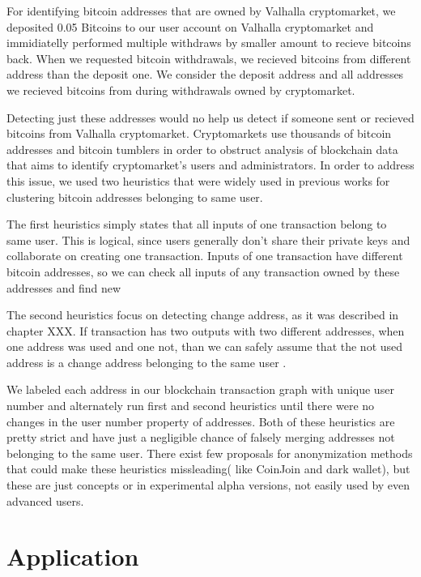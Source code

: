 \documentclass[
  digital, %
  table,   %
  lof,     %
  lot,     %
  oneside
]{fithesis3}
\begin{document}
For identifying bitcoin addresses that are owned by Valhalla cryptomarket, we 
deposited 0.05 Bitcoins to our user account on Valhalla cryptomarket and immidiatelly
performed multiple withdraws by smaller amount to recieve bitcoins back.
When we requested bitcoin withdrawals, we recieved bitcoins from different address
than the deposit one. We consider the deposit address and all addresses we recieved
bitcoins from during withdrawals owned by cryptomarket.

Detecting just these addresses would no help us detect
if someone sent or recieved bitcoins from Valhalla cryptomarket.
Cryptomarkets use thousands of bitcoin addresses and
bitcoin tumblers in order to obstruct analysis of blockchain data
that aims to identify cryptomarket's users and administrators.
In order to address this issue, we used two heuristics that were widely used
in previous works \parencite{androulaki2013evaluating}\parencite{reid2013analysis}
for clustering bitcoin addresses belonging to same user.

The first heuristics simply states that all inputs of one transaction belong to same user. This is logical,
since users generally don't share their private keys and collaborate on creating one transaction.
Inputs of one transaction have different bitcoin addresses, so we can check all inputs of any transaction
owned by these addresses and find new 

The second heuristics focus on detecting change address, as it was described in chapter XXX.
If transaction has two outputs with two different addresses, when one address was used and one not,
than we can safely assume that the not used address is a change address belonging to the same user \parencite{androulaki2013evaluating}.

We labeled each address in our blockchain transaction graph with unique user number
and alternately run first and second heuristics until there were no changes in the user number property of addresses.
Both of these heuristics are pretty strict and have just a negligible chance of falsely merging
addresses not belonging to the same user\parencite{androulaki2013evaluating}.
There exist few proposals for anonymization methods that could make
these heuristics missleading( like CoinJoin and dark wallet), but
these are just concepts or in experimental alpha versions, not easily
used by even advanced users.

\chapter{Application}
\end{document}
